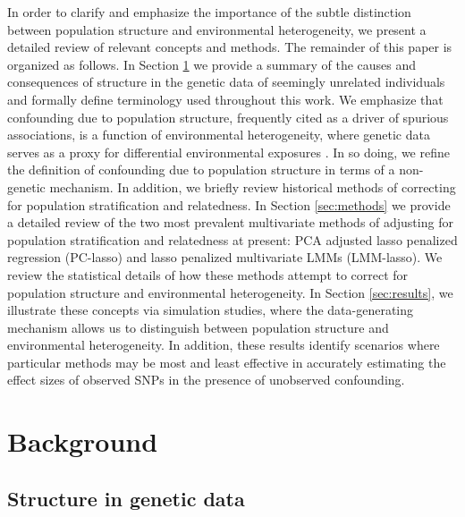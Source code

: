 In order to clarify and emphasize the importance of the subtle distinction between population structure and environmental heterogeneity, we present a detailed review of relevant concepts and methods. The remainder of this paper is organized as follows. In Section \ref{sec:background} we provide a summary of the causes and consequences of structure in the genetic data of seemingly unrelated individuals and formally define terminology used throughout this work. We emphasize that confounding due to population structure, frequently cited as a driver of spurious associations, is a function of environmental heterogeneity, where genetic data serves as a proxy for differential environmental exposures \citep{Sillanpaeae2011, sul2018population, vilhjalmsson2012nature, barton2019population}. In so doing, we refine the definition of confounding due to population structure in terms of a non-genetic mechanism. In addition, we briefly review historical methods of correcting for population stratification and relatedness. In Section \ref{sec:methods} we provide a detailed review of the two most prevalent multivariate methods of adjusting for population stratification and relatedness at present: PCA adjusted lasso penalized regression (PC-lasso) and lasso penalized multivariate LMMs (LMM-lasso). We review the statistical details of how these methods attempt to correct for population structure and environmental heterogeneity. In Section \ref{sec:results}, we illustrate these concepts via simulation studies, where the data-generating mechanism allows us to distinguish between population structure and environmental heterogeneity. In addition, these results identify scenarios where particular methods may be most and least effective in accurately estimating the effect sizes of observed SNPs in the presence of unobserved confounding.

\section{Background} \label{sec:background}

\subsection{Structure in genetic data}

